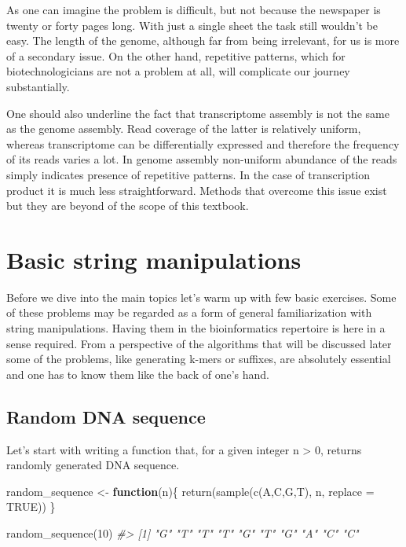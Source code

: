 \documentclass[
]{book}
\newenvironment{Shaded}{\begin{snugshade}}{\end{snugshade}}
\newcommand{\AttributeTok}[1]{\textcolor[rgb]{0.77,0.63,0.00}{#1}}
\newcommand{\CommentTok}[1]{\textcolor[rgb]{0.56,0.35,0.01}{\textit{#1}}}
\newcommand{\ConstantTok}[1]{\textcolor[rgb]{0.00,0.00,0.00}{#1}}
\newcommand{\ControlFlowTok}[1]{\textcolor[rgb]{0.13,0.29,0.53}{\textbf{#1}}}
\newcommand{\DecValTok}[1]{\textcolor[rgb]{0.00,0.00,0.81}{#1}}
\newcommand{\FunctionTok}[1]{\textcolor[rgb]{0.00,0.00,0.00}{#1}}
\newcommand{\NormalTok}[1]{#1}
\newcommand{\OtherTok}[1]{\textcolor[rgb]{0.56,0.35,0.01}{#1}}
\newcommand{\StringTok}[1]{\textcolor[rgb]{0.31,0.60,0.02}{#1}}
\begin{document}
As one can imagine the problem is difficult, but not because the newspaper is twenty or forty pages long. With just a single sheet the task still wouldn't be easy. The length of the genome, although far from being irrelevant, for us is more of a secondary issue. On the other hand, repetitive patterns, which for biotechnologicians are not a problem at all, will complicate our journey substantially.

One should also underline the fact that transcriptome assembly is not the same as the genome assembly. Read coverage of the latter is relatively uniform, whereas transcriptome can be differentially expressed and therefore the frequency of its reads varies a lot. In genome assembly non-uniform abundance of the reads simply indicates presence of repetitive patterns. In the case of transcription product it is much less straightforward. Methods that overcome this issue exist but they are beyond of the scope of this textbook.

\hypertarget{basic}{%
\chapter{Basic string manipulations}\label{basic}}

Before we dive into the main topics let's warm up with few basic exercises. Some of these problems may be regarded as a form of general familiarization with string manipulations. Having them in the bioinformatics repertoire is here in a sense required. From a perspective of the algorithms that will be discussed later some of the problems, like generating k-mers or suffixes, are absolutely essential and one has to know them like the back of one's hand.

\hypertarget{random-dna-sequence}{%
\section{Random DNA sequence}\label{random-dna-sequence}}

Let's start with writing a function that, for a given integer n \textgreater{} 0, returns randomly generated DNA sequence.

\begin{Shaded}
\begin{Highlighting}[]
\NormalTok{random\_sequence }\OtherTok{\textless{}{-}} \ControlFlowTok{function}\NormalTok{(n)\{}
  \FunctionTok{return}\NormalTok{(}\FunctionTok{sample}\NormalTok{(}\FunctionTok{c}\NormalTok{(}\StringTok{\textquotesingle{}A\textquotesingle{}}\NormalTok{,}\StringTok{\textquotesingle{}C\textquotesingle{}}\NormalTok{,}\StringTok{\textquotesingle{}G\textquotesingle{}}\NormalTok{,}\StringTok{\textquotesingle{}T\textquotesingle{}}\NormalTok{), n, }\AttributeTok{replace =} \ConstantTok{TRUE}\NormalTok{))}
\NormalTok{\}}

\FunctionTok{random\_sequence}\NormalTok{(}\DecValTok{10}\NormalTok{)}
\CommentTok{\#\textgreater{}  [1] "G" "T" "T" "T" "G" "T" "G" "A" "C" "C"}
\end{Highlighting}
\end{Shaded}
\end{document}
